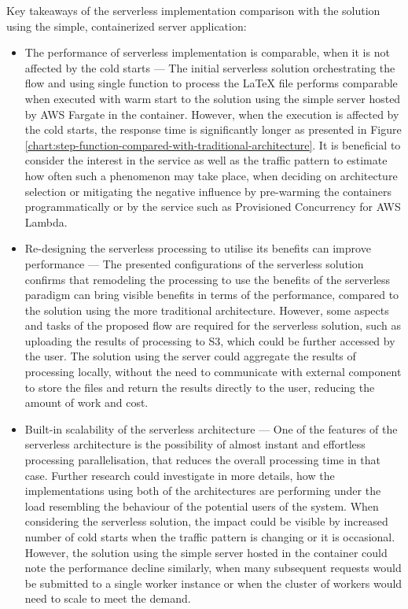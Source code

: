 Key takeaways of the serverless implementation comparison with the solution using the simple, containerized server application:

\begin{itemize}
   \item The performance of serverless implementation is comparable, when it is not affected by the cold starts --- The initial serverless solution orchestrating the flow and using single function to process the LaTeX file performs comparable when executed with warm start to the solution using the simple server hosted by AWS Fargate in the container. However, when the execution is affected by the cold starts, the response time is significantly longer as presented in Figure \ref{chart:step-function-compared-with-traditional-architecture}.
   It is beneficial to consider the interest in the service as well as the traffic pattern to estimate how often such a phenomenon may take place, when deciding on architecture selection or mitigating the negative influence by pre-warming the containers programmatically or by the service such as Provisioned Concurrency for AWS Lambda.
   \item Re-designing the serverless processing to utilise its benefits can improve performance --- The presented configurations of the serverless solution confirms that remodeling the processing to use the benefits of the serverless paradigm can bring visible benefits in terms of the performance, compared to the solution using the more traditional architecture.
   However, some aspects and tasks of the proposed flow are required for the serverless solution, such as uploading the results of processing to S3, which could be further accessed by the user.
   The solution using the server could aggregate the results of processing locally, without the need to communicate with external component to store the files and return the results directly to the user, reducing the amount of work and cost.
   \item Built-in scalability of the serverless architecture --- One of the features of the serverless architecture is the possibility of almost instant and effortless processing parallelisation, that reduces the overall processing time in that case.
   Further research could investigate in more details, how the implementations using both of the architectures are performing under the load resembling the behaviour of the potential users of the system.
   When considering the serverless solution, the impact could be visible by increased number of cold starts when the traffic pattern is changing or it is occasional. However, the solution using the simple server hosted in the container could note the performance decline similarly, when many subsequent requests would be submitted to a single worker instance or when the cluster of workers would need to scale to meet the demand.
\end{itemize}

